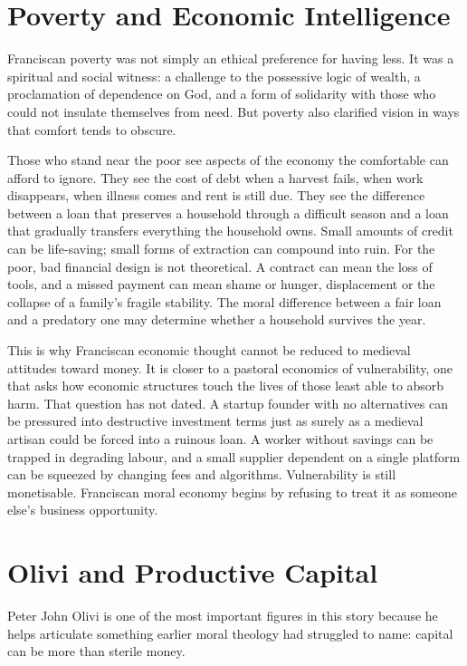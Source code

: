 \documentclass[11pt,a4paper,oneside]{book}
\begin{document}
\section*{Poverty and Economic Intelligence}

Franciscan poverty was not simply an ethical preference for having less. It was a spiritual and social witness: a challenge to the possessive logic of wealth, a proclamation of dependence on God, and a form of solidarity with those who could not insulate themselves from need. But poverty also clarified vision in ways that comfort tends to obscure.

Those who stand near the poor see aspects of the economy the comfortable can afford to ignore. They see the cost of debt when a harvest fails, when work disappears, when illness comes and rent is still due. They see the difference between a loan that preserves a household through a difficult season and a loan that gradually transfers everything the household owns. Small amounts of credit can be life-saving; small forms of extraction can compound into ruin. For the poor, bad financial design is not theoretical. A contract can mean the loss of tools, and a missed payment can mean shame or hunger, displacement or the collapse of a family's fragile stability. The moral difference between a fair loan and a predatory one may determine whether a household survives the year.

This is why Franciscan economic thought cannot be reduced to medieval attitudes toward money. It is closer to a pastoral economics of vulnerability, one that asks how economic structures touch the lives of those least able to absorb harm. That question has not dated. A startup founder with no alternatives can be pressured into destructive investment terms just as surely as a medieval artisan could be forced into a ruinous loan. A worker without savings can be trapped in degrading labour, and a small supplier dependent on a single platform can be squeezed by changing fees and algorithms. Vulnerability is still monetisable. Franciscan moral economy begins by refusing to treat it as someone else's business opportunity.

\section*{Olivi and Productive Capital}

Peter John Olivi is one of the most important figures in this story because he helps articulate something earlier moral theology had struggled to name: capital can be more than sterile money.
\end{document}
